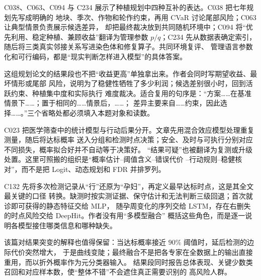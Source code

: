 C038、C063、C094 与 C234 展示了种植规划中四种互补的表达。C038 把七年规划先写成明确的
地块、季次、作物和轮作约束，再用 CVaR 讨论尾部风险；C063 让典型情景负责展示候选差异，
却把最终裁决放到共同随机环境中；C094 将“优先利用、稳定种植、兼顾收益”翻译为管理参数
$p/q$；C234 先从数据表确定索引，随后将三类真实邻接关系写进染色体和修复算子。共同环境复评、
管理语言参数化和可行编码，都是“现实判断怎样进入模型”的具体答案。

这组规划论文的结果段也不把“收益更高”单独拿出来。作者会同时写期望收益、最坏情形或尾部
风险，说明为了稳健性牺牲了多少利润；候选差别很小时，回到活跃约束、种植集中度和实际执行
难度裁决。适合复用的句序是：“方案……在基准情景下……；置于相同的……情景后，……；
差异主要来自……约束，因此选择……。”三个省略处都必须填入本题对象和读数。

C023 把医学筛查中的统计模型与行动后果分开。文章先用混合效应模型处理重复测量，随后将达标概率
送入分组和检测时点决策；安全、及时与可执行分别对应不同损失，概率拟合好并不自动等于决策好。
“结果可疑”也被翻译为复测或升级处置。这里可照搬的组织是“概率估计--阈值含义--错误代价
--行动规则--稳健核对”，而不是把 Logit、动态规划和 FDR 并排罗列。

C132 先将多次检测记录从“行”还原为“孕妇”，再定义最早达标时点，这是其全文最关键的口径
转换。缺测时按实测证据、保守估计和无法判断三级回退；首次就诊即可获得的静态特征交给 MLP，
随孕周变化的序列交给 LSTM，存在右删失的时点风险交给 DeepHit。作者没有用“多模型融合”
概括这些角色，而是逐一说明各模型接住哪类信息和哪种缺失。

该篇对结果突变的解释也值得保留：当达标概率接近 $90\%$ 阈值时，延后检测的边际代价突然增大，
于是曲线变陡；最终融合不是把各专家在全数据上的输出直接重用，而以折外概率作为元分类器输入。
结果段同时报告总体表现、关键少数类召回和对应样本数，使“整体不错”不会遮住真正需要识别的
高风险人群。
